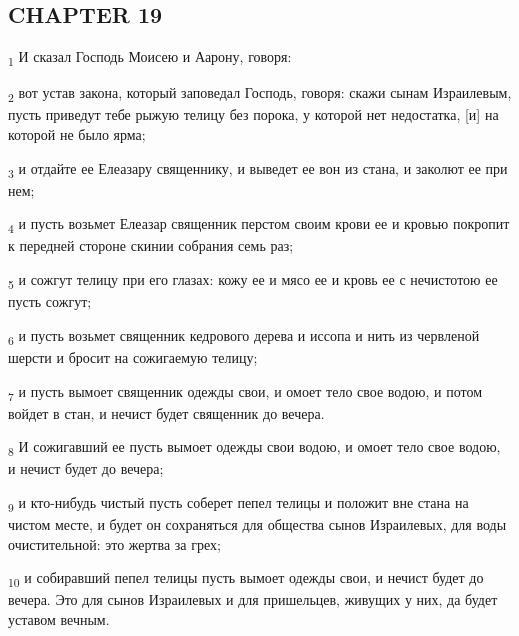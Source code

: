 \subsection{CHAPTER 19}
\begin{tcolorbox}
\textsubscript{1} И сказал Господь Моисею и Аарону, говоря:
\end{tcolorbox}
\begin{tcolorbox}
\textsubscript{2} вот устав закона, который заповедал Господь, говоря: скажи сынам Израилевым, пусть приведут тебе рыжую телицу без порока, у которой нет недостатка, [и] на которой не было ярма;
\end{tcolorbox}
\begin{tcolorbox}
\textsubscript{3} и отдайте ее Елеазару священнику, и выведет ее вон из стана, и заколют ее при нем;
\end{tcolorbox}
\begin{tcolorbox}
\textsubscript{4} и пусть возьмет Елеазар священник перстом своим крови ее и кровью покропит к передней стороне скинии собрания семь раз;
\end{tcolorbox}
\begin{tcolorbox}
\textsubscript{5} и сожгут телицу при его глазах: кожу ее и мясо ее и кровь ее с нечистотою ее пусть сожгут;
\end{tcolorbox}
\begin{tcolorbox}
\textsubscript{6} и пусть возьмет священник кедрового дерева и иссопа и нить из червленой шерсти и бросит на сожигаемую телицу;
\end{tcolorbox}
\begin{tcolorbox}
\textsubscript{7} и пусть вымоет священник одежды свои, и омоет тело свое водою, и потом войдет в стан, и нечист будет священник до вечера.
\end{tcolorbox}
\begin{tcolorbox}
\textsubscript{8} И сожигавший ее пусть вымоет одежды свои водою, и омоет тело свое водою, и нечист будет до вечера;
\end{tcolorbox}
\begin{tcolorbox}
\textsubscript{9} и кто-нибудь чистый пусть соберет пепел телицы и положит вне стана на чистом месте, и будет он сохраняться для общества сынов Израилевых, для воды очистительной: это жертва за грех;
\end{tcolorbox}
\begin{tcolorbox}
\textsubscript{10} и собиравший пепел телицы пусть вымоет одежды свои, и нечист будет до вечера. Это для сынов Израилевых и для пришельцев, живущих у них, да будет уставом вечным.
\end{tcolorbox}
